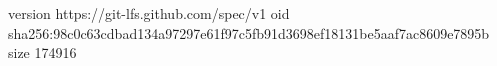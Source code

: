 version https://git-lfs.github.com/spec/v1
oid sha256:98c0c63cdbad134a97297e61f97c5fb91d3698ef18131be5aaf7ac8609e7895b
size 174916
